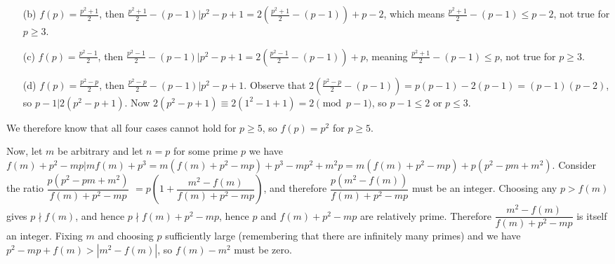 \documentclass[11pt,a4paper]{article}
\begin{document}
\begin{itemize}
\begin{itemize}
\item [(b)] $f(p)=\frac{p^2+1}2$, 
then $\frac{p^2+1}2-(p-1)|p^2-p+1=2(\frac{p^2+1}2-(p-1))+p-2$, 
which means $\frac{p^2+1}2-(p-1)\le p-2$, not true for $p\ge 3$. 

\item [(c)] $f(p)=\frac{p^2-1}2$, 
then $\frac{p^2-1}2-(p-1)|p^2-p+1=2(\frac{p^2-1}2-(p-1))+p$, 
meaning  $\frac{p^2+1}2-(p-1)\le p$, not true for $p\ge 3$. 

\item [(d)] $f(p)=\frac{p^2-p}2$, 
then $\frac{p^2-p}2-(p-1)|p^2-p+1$. 
Observe that $2(\frac{p^2-p}2-(p-1))=p(p-1)-2(p-1)=(p-1)(p-2)$, 
so $p-1|2(p^2-p+1)$. Now $2(p^2-p+1)\equiv 2(1^2-1+1)=2\pmod{p-1}$, 
so $p-1\le 2$ or $p\le 3$. 
\end{itemize}
We therefore know that all four cases cannot hold for $p\ge 5$, so $f(p)=p^2$ for $p\ge 5$. 

Now, let $m$ be arbitrary and let $n=p$ for some prime $p$ we have 
$f(m)+p^2-mp|mf(m)+p^3=m(f(m)+p^2-mp)+p^3-mp^2+m^2p=m(f(m)+p^2-mp)+p(p^2-pm+m^2)$. 
Consider the ratio $\dfrac{p(p^2-pm+m^2)}{f(m)+p^2-mp}$
$=p\left(1+\dfrac{m^2-f(m)}{f(m)+p^2-mp}\right)$, 
and therefore $\dfrac{p(m^2-f(m))}{f(m)+p^2-mp}$
must be an integer. 
Choosing any $p>f(m)$ gives 
$p\nmid f(m)$, and hence $p\nmid f(m)+p^2-mp$, hence $p$ and $f(m)+p^2-mp$ are relatively prime. 
Therefore $\dfrac{m^2-f(m)}{f(m)+p^2-mp}$ is itself an integer. 
Fixing $m$ and choosing $p$ sufficiently large (remembering that there are infinitely many primes) and we have $p^2-mp+f(m)>|m^2-f(m)|$, so $f(m)-m^2$ must be zero. 

\end{itemize}
\end{document}
